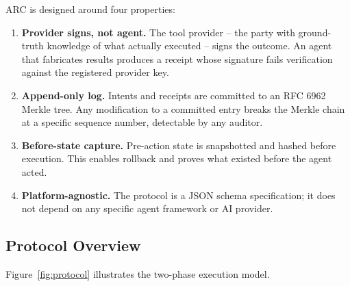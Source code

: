 \documentclass[10pt,twocolumn]{article}
\begin{document}
ARC is designed around four properties:
\begin{enumerate}[noitemsep,topsep=2pt,label=\textbf{G\arabic*.}]
  \item \textbf{Provider signs, not agent.} The tool provider -- the party with
    ground-truth knowledge of what actually executed -- signs the outcome.
    An agent that fabricates results produces a receipt whose signature fails
    verification against the registered provider key.
  \item \textbf{Append-only log.} Intents and receipts are committed to an
    RFC 6962 Merkle tree. Any modification to a committed entry breaks the
    Merkle chain at a specific sequence number, detectable by any auditor.
  \item \textbf{Before-state capture.} Pre-action state is snapshotted and
    hashed before execution. This enables rollback and proves what existed
    before the agent acted.
  \item \textbf{Platform-agnostic.} The protocol is a JSON schema specification;
    it does not depend on any specific agent framework or AI provider.
\end{enumerate}

\subsection{Protocol Overview}

Figure~\ref{fig:protocol} illustrates the two-phase execution model.
\end{document}
